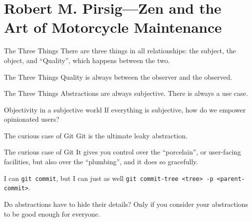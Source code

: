 \documentclass[aspectratio=169]{beamer}
\begin{document}
  \section{Robert M. Pirsig—Zen and the Art of Motorcycle Maintenance}
  \begin{frame}{The Three Things}
    There are three things in all relationships: the subject, the object, and
    “Quality”, which happens between the two.
  \end{frame}
  \begin{frame}{The Three Things}
    Quality is always between the observer and the observed.
  \end{frame}
  \begin{frame}{The Three Things}
    Abstractions are always subjective. There is always a use case.
  \end{frame}
  \begin{frame}{Objectivity in a subjective world}
    If everything is subjective, how do we empower opinionated users?
  \end{frame}
  \begin{frame}{The curious case of Git}
    Git is the ultimate leaky abstraction.
  \end{frame}
  \begin{frame}{The curious case of Git}
    It gives you control over the “porcelain”, or user-facing facilities, but
    also over the “plumbing”, and it does so gracefully.

    \small{%
      I can \texttt{git commit}, but I can just as well \texttt{git commit-tree
      <tree> -p <parent-commit>}.
    }
  \end{frame}
  \begin{frame}{Do abstractions have to hide their details?}
    Only if you consider your abstractions to be good enough for everyone.
  \end{frame}
\end{document}

